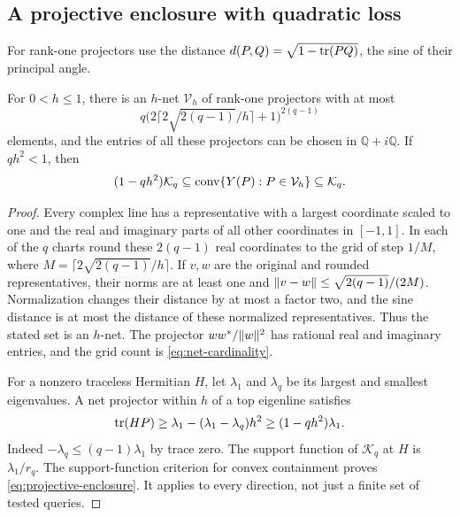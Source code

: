 \subsection{A projective enclosure with quadratic loss}
For rank-one projectors use the distance
$d(P,Q)=\sqrt{1-\operatorname{tr}(PQ)}$, the sine of their principal angle.
\begin{lemma}\label{lem:projective-net}
For $0<h\le1$, there is an $h$-net $\mathcal V_h$ of rank-one
projectors with at most
\begin{equation}\label{eq:net-cardinality}
 q\bigl(2\lceil2\sqrt{2(q-1)}/h\rceil+1\bigr)^{2(q-1)}
\end{equation}
elements, and the entries of all these projectors can be chosen in
$\mathbb Q+i\mathbb Q$. If $qh^2<1$, then
\begin{equation}\label{eq:projective-enclosure}
 (1-qh^2)\mathcal K_q\subseteq
 \operatorname{conv}\{Y(P):P\in\mathcal V_h\}\subseteq\mathcal K_q.
\end{equation}
\end{lemma}
\begin{proof}
Every complex line has a representative with a largest coordinate
scaled to one and the real and imaginary parts of all other coordinates
in $[-1,1]$. In each of the $q$ charts round these $2(q-1)$ real
coordinates to the grid of step $1/M$, where
$M=\lceil2\sqrt{2(q-1)}/h\rceil$. If $v,w$ are the original and
rounded representatives, their norms are at least one and
$\lVert v-w\rVert\le\sqrt{2(q-1)}/(2M)$. Normalization changes their
distance by at most a factor two, and the sine distance is at most
the distance of these normalized representatives. Thus the stated
set is an $h$-net. The projector $ww^*/\lVert w\rVert^2$ has rational real
and imaginary entries, and the grid count is \eqref{eq:net-cardinality}.

For a nonzero traceless Hermitian $H$, let $\lambda_1$ and $\lambda_q$
be its largest and smallest eigenvalues. A net projector within $h$
of a top eigenline satisfies
\[
 \operatorname{tr}(HP)\ge\lambda_1-(\lambda_1-\lambda_q)h^2
                \ge(1-qh^2)\lambda_1.
\]
Indeed $-\lambda_q\le(q-1)\lambda_1$ by trace zero. The support
function of $\mathcal K_q$ at $H$ is $\lambda_1/r_q$.
The support-function criterion for convex containment proves
\eqref{eq:projective-enclosure}. It applies to every direction, not
just a finite set of tested queries.
\end{proof}


